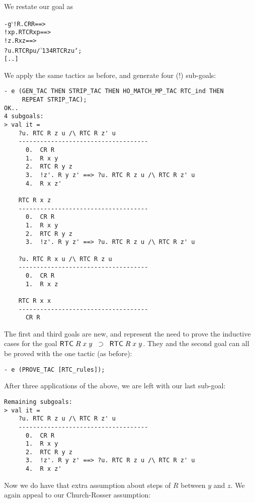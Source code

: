 \documentclass[12pt]{article}
\begin{document}
We restate our goal as
\newcommand{\bk}{\char'134}
\begin{session}\begin{alltt}
- g `!R. CR R ==>
         !x p. RTC R x p ==>
               \psframebox[linestyle=dashed]{RTC R x p /\bk} !z. R x z ==>
                   ?u. RTC R p u /\bk{} RTC R z u`;
[..]
\end{alltt}\end{session}
We apply the same tactics as before, and generate four (!) sub-goals:
\begin{session}\begin{verbatim}
- e (GEN_TAC THEN STRIP_TAC THEN HO_MATCH_MP_TAC RTC_ind THEN
     REPEAT STRIP_TAC);
OK..
4 subgoals:
> val it =
    ?u. RTC R z u /\ RTC R z' u
    ------------------------------------
      0.  CR R
      1.  R x y
      2.  RTC R y z
      3.  !z'. R y z' ==> ?u. RTC R z u /\ RTC R z' u
      4.  R x z'

    RTC R x z
    ------------------------------------
      0.  CR R
      1.  R x y
      2.  RTC R y z
      3.  !z'. R y z' ==> ?u. RTC R z u /\ RTC R z' u

    ?u. RTC R x u /\ RTC R z u
    ------------------------------------
      0.  CR R
      1.  R x z

    RTC R x x
    ------------------------------------
      CR R
\end{verbatim}\end{session}
The first and third goals are new, and represent the need to prove
the inductive cases for the goal
${\sf RTC}\;R\;x\;y\;\;\supset\;\;{\sf RTC}\;R\;x\;y$.  They and the
second goal can all be proved with the one tactic (as before):
\begin{session}\begin{verbatim}
- e (PROVE_TAC [RTC_rules]);
\end{verbatim}\end{session}
After three applications of the above, we are left with our last
sub-goal:
\begin{session}\begin{verbatim}
Remaining subgoals:
> val it =
    ?u. RTC R z u /\ RTC R z' u
    ------------------------------------
      0.  CR R
      1.  R x y
      2.  RTC R y z
      3.  !z'. R y z' ==> ?u. RTC R z u /\ RTC R z' u
      4.  R x z'
\end{verbatim}\end{session}
Now we do have that extra assumption about steps of $R$ between $y$
and $z$.  We again appeal to our Church-Rosser assumption:
\end{document}
